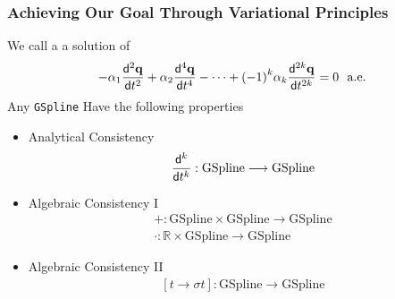 \begin{frame}[t]
	\frametitle{Achieving Our Goal Through Variational Principles}
	{\fontsize{9}{5}
		We call a  a solution of
		\begin{equation*}
			-\alpha_1 \frac{\mathsf{d}^{2} \mathbf{q}}{\mathsf{d} t^{2}}+ \alpha_2 \frac{\mathsf{d}^{4} \mathbf{q}}{\mathsf{d} t^{4}}- \cdots +  {(-1)}^k \alpha_k \frac{\mathsf{d}^{2k} \mathbf{q}}{\mathsf{d} t^{2k}}= 0 \ \ \text{a.e.}
		\end{equation*}
		Any \texttt{GSpline} Have the following properties
		\begin{itemize}
			\item Analytical Consistency
			      \begin{equation*}
				      \frac{\mathsf{d}^{k} }{\mathsf{d} t^{k}}:\text{GSpline}\longrightarrow \text{GSpline}
			      \end{equation*}
			\item Algebraic Consistency I
			      \begin{eqnarray*}
				      +:\text{GSpline}\times\text{GSpline}\longrightarrow \text{GSpline}\\
				      \cdot:\mathbb{R} \times \text{GSpline}\longrightarrow \text{GSpline}
			      \end{eqnarray*}
			\item Algebraic Consistency II
			      \begin{eqnarray*}
				      \left[t \rightarrow \sigma t \right]:\text{GSpline}\longrightarrow \text{GSpline}
			      \end{eqnarray*}
		\end{itemize}
	}
\end{frame}
